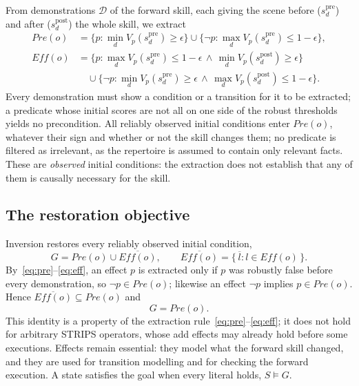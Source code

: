 From demonstrations $\mathcal{D}$ of the forward skill, each giving the scene before
($s^{\mathrm{pre}}_d$) and after ($s^{\mathrm{post}}_d$) the whole skill, we extract
\begin{align}
  \mathit{Pre}(o) &= \{p : \min_d V_p(s^{\mathrm{pre}}_d)\ge\epsilon\}
     \cup \{\neg p : \max_d V_p(s^{\mathrm{pre}}_d)\le 1-\epsilon\},
     \label{eq:pre}\\
  \mathit{Eff}(o) &= \{p : \max_d V_p(s^{\mathrm{pre}}_d)\le1-\epsilon \,\wedge\, \min_d V_p(s^{\mathrm{post}}_d)\ge\epsilon\}
     \nonumber\\
  &\quad\cup \{\neg p : \min_d V_p(s^{\mathrm{pre}}_d)\ge\epsilon \,\wedge\, \max_d V_p(s^{\mathrm{post}}_d)\le1-\epsilon\}.
     \label{eq:eff}
\end{align}
Every demonstration must show a condition or a transition for it to be extracted; a
predicate whose initial scores are not all on one side of the robust thresholds yields
no precondition. All reliably observed initial conditions enter $\mathit{Pre}(o)$,
whatever their sign and whether or not the skill changes them; no predicate is
filtered as irrelevant, as the repertoire is assumed to contain only relevant facts.
These are \emph{observed} initial conditions: the extraction does not establish that
any of them is causally necessary for the skill.

\subsection{The restoration objective}
\label{sec:goal}

Inversion restores every reliably observed initial condition,
\begin{equation}
  G=\mathit{Pre}(o)\cup\overline{\mathit{Eff}(o)},\qquad
  \overline{\mathit{Eff}(o)}=\{\,\overline{l}: l\in\mathit{Eff}(o)\,\}.
\end{equation}
By~\eqref{eq:pre}--\eqref{eq:eff}, an effect $p$ is extracted only if $p$ was robustly
false before every demonstration, so $\neg p\in\mathit{Pre}(o)$; likewise an effect
$\neg p$ implies $p\in\mathit{Pre}(o)$. Hence $\overline{\mathit{Eff}(o)}\subseteq\mathit{Pre}(o)$
and
\begin{equation}
  G=\mathit{Pre}(o).
\end{equation}
This identity is a property of the extraction rule~\eqref{eq:pre}--\eqref{eq:eff}; it
does not hold for arbitrary STRIPS operators, whose add effects may already hold before
some executions. Effects remain essential: they model what the forward skill changed,
and they are used for transition modelling and for checking the forward execution.
A state satisfies the goal when every literal holds, $S\models G$.

